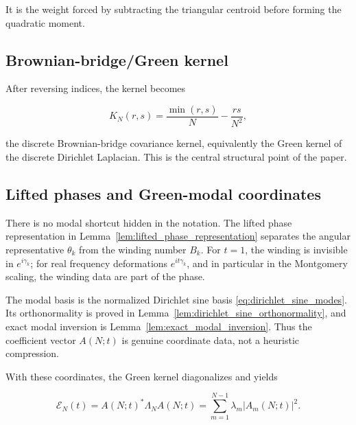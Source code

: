 \documentclass[11pt]{amsart}
\numberwithin{equation}{section}
\theoremstyle{plain}
\theoremstyle{definition}
\theoremstyle{remark}
\begin{document}
It is the weight forced by subtracting the triangular centroid before
forming the quadratic moment.

\subsection{Brownian-bridge/Green kernel}
\label{subsec:conclusion_brownian_green_kernel}
\leavevmode\par\nobreak

After reversing indices, the kernel becomes

\begin{equation}
K_N(r,s)
=
\frac{\min(r,s)}{N}
-
\frac{rs}{N^2},
\label{eq:conclusion_brownian_green_kernel}
\end{equation}

the discrete Brownian-bridge covariance kernel, equivalently the Green
kernel of the discrete Dirichlet Laplacian. This is the central
structural point of the paper.

\subsection{Lifted phases and Green-modal coordinates}
\label{subsec:conclusion_lifted_phases_green_modal_coordinates}
\leavevmode\par\nobreak

There is no modal shortcut hidden in the notation. The lifted phase
representation in Lemma~\ref{lem:lifted_phase_representation} separates
the angular representative \(\theta_k\) from the winding number \(B_k\).
For \(t=1\), the winding is invisible in \(e^{i\gamma_k}\); for real
frequency deformations \(e^{it\gamma_k}\), and in particular in the
Montgomery scaling, the winding data are part of the phase.

The modal basis is the normalized Dirichlet sine basis
\eqref{eq:dirichlet_sine_modes}. Its orthonormality is proved in
Lemma~\ref{lem:dirichlet_sine_orthonormality}, and exact modal inversion
is Lemma~\ref{lem:exact_modal_inversion}. Thus the coefficient vector
\(A(N;t)\) is genuine coordinate data, not a heuristic compression.

With these coordinates, the Green kernel diagonalizes and yields

\begin{equation}
\mathcal E_N(t)
=
A(N;t)^*\Lambda_NA(N;t)
=
\sum_{m=1}^{N-1}
\lambda_m|A_m(N;t)|^2.
\label{eq:conclusion_green_energy_modal_decomposition}
\end{equation}
\end{document}
